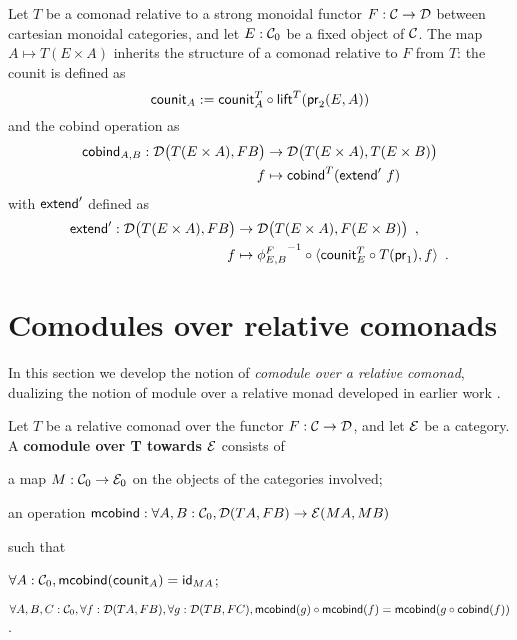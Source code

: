 \documentclass{amsart}
\newcommand{\fat}[1]{\textbf{#1}}
\begin{document}
\begin{definition}\label{product_comonad}
  Let $T$ be a comonad relative to a strong monoidal functor $F:\C\to\D$ between cartesian monoidal categories,
  and let $E:\C_0$ be a fixed object of $\C$.
 The map $A\mapsto T(E\times A)$ inherits the structure of a comonad relative to $F$ from $T$: the 
 counit is defined as
   \[ \counit_A := \comp{\lift^T(\pr_2(E,A))}{\counit^T_{A}} \]
  and the cobind operation as
   \begin{align*} 
            \cobind_{A,B} : \D\bigl(T(E\times A),FB\bigr) &\to \D\bigl(T(E\times A),T(E\times B)\bigr) \\
              f &\mapsto  \cobind^T(\extend'~f)
   \end{align*}
  with $\extend'$ defined as 
  \begin{align*} \extend' : \D\bigl(T(E\times A),FB\bigr) &\to \D\bigl(T(E\times A), F(E\times B)\bigr) \enspace , \\ 
                                            f & \mapsto \comp{\langle \comp{T(\pr_1)}{\counit^T_E}, f \rangle}{{\phi^{F}_{E,B}}^{-1}} \enspace .
  \end{align*}
\end{definition}





\section{Comodules over relative comonads}\label{sec:comodules}

In this section we develop the notion of \emph{comodule over a relative comonad}, dualizing the notion of module over a relative monad  developed in earlier work \parencite{ahrens_relmonads}.

\begin{definition}\label{def:comodule}
 Let $T$ be a relative comonad over the functor $F:\C\to\D$, and let $\E$ be a category.
 A \fat{comodule over T towards $\E$} consists of
   \begin{packitem}
   \item a map $M:\C_0 \to \E_0$ on the objects of the categories involved;
   \item an operation $\mcobind: \forall A,B:\C_0, \D(TA,FB) \to \E(MA,MB)$
  \end{packitem}
  such that 
  \begin{packitem}
   \item $\forall A : \C_0, \mcobind(\counit_A) = \id_{MA}$;
   \item $\forall A,B,C:\C_0, \forall f : \D(TA,FB),\forall g:\D(TB,FC), \\
        \comp{\mcobind(f)}{\mcobind(g)} = \mcobind(\comp{\cobind(f)}{g})$ .
  \end{packitem}

\end{definition}
\end{document}
